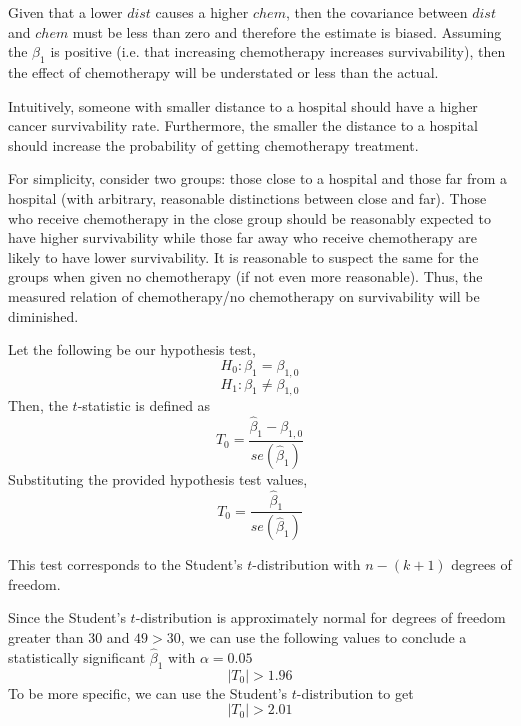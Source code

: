 \documentclass[12pt,twoside]{article}
\begin{document}
\begin{problems}
\begin{problemparts}
\problempart %

Given that a lower $dist$ causes a higher $chem$, then the covariance between
$dist$ and $chem$ must be less than zero and therefore the estimate is biased.
Assuming the $\beta_1$ is positive (i.e. that increasing chemotherapy increases 
survivability), then the effect of chemotherapy will be understated or less
than the actual. 

\problempart %

Intuitively, someone with smaller distance to a hospital should have a higher 
cancer survivability rate. Furthermore, the smaller the distance to a
hospital should increase the probability of getting chemotherapy treatment.

For simplicity, consider two groups: those close to a hospital and those far
from a hospital (with arbitrary, reasonable distinctions between close and
far). Those who receive chemotherapy in the close group should be reasonably 
expected to have higher survivability while those far away who receive
chemotherapy are likely to have lower survivability. It is reasonable to 
suspect the same for the groups when given no chemotherapy (if not even 
more reasonable). Thus, the measured relation of chemotherapy/no chemotherapy 
on survivability will be diminished.

\end{problemparts}

\problem  %

\begin{problemparts}

\problempart %

Let the following be our hypothesis test,
$$ H_0 : \beta_1 = \beta_{1,0} $$
$$ H_1 : \beta_1 \neq \beta_{1,0} $$
Then, the $t$-statistic is defined as
$$ T_0 = \frac{\hat{\beta}_1 - \beta_{1,0}}{se(\hat{\beta}_1)} $$
Substituting the provided hypothesis test values,
$$ T_0 = \boxed{\frac{\hat{\beta}_1}{se(\hat{\beta}_1)}} $$

\problempart %

This test corresponds to the Student's $t$-distribution with $\boxed{n - (k + 1)}$
degrees of freedom.

\problempart %

Since the Student's $t$-distribution is approximately normal for degrees of 
freedom greater than $30$ and $49 > 30$, we can use the following values to 
conclude a statistically significant $\hat{\beta}_1$ with $\alpha = 0.05$
$$\vert T_0 \vert > 1.96$$
To be more specific, we can use the Student's $t$-distribution to get
$$\boxed{\vert T_0 \vert > 2.01}$$


\end{problemparts}
\end{problems}
\end{document}
